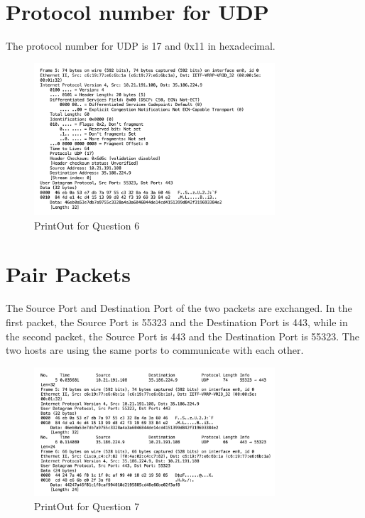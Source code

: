 \documentclass{article}
\begin{document}
\section{Protocol number for UDP}
The protocol number for UDP is 17 and 0x11 in hexadecimal.
\begin{figure}[H]
    \centering
    \includegraphics[width=0.8\textwidth]{Q6 - PrintOut.png}
    \caption{PrintOut for Question 6}
\end{figure}
\section{Pair Packets}
The Source Port and Destination Port of the two packets are exchanged.
In the first packet, the Source Port is 55323 and the Destination Port is 443,
while in the second packet, the Source Port is 443 and the Destination Port is 55323.
The two hosts are using the same ports to communicate with each other.
\begin{figure}[H]
    \centering
    \includegraphics[width=0.8\textwidth]{Q7 - PrintOut.png}
    \caption{PrintOut for Question 7}
\end{figure}
\end{document}
